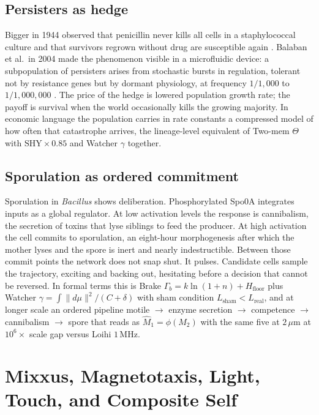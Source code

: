 \documentclass[12pt,a4paper]{article}
\begin{document}
\subsection{Persisters as hedge}

Bigger in 1944 observed that penicillin never kills all cells in a staphylococcal culture and that survivors regrown without drug are susceptible again \cite{bigger1944}. Balaban et al.\ in 2004 made the phenomenon visible in a microfluidic device: a subpopulation of persisters arises from stochastic bursts in regulation, tolerant not by resistance genes but by dormant physiology, at frequency $1/1{,}000$ to $1/1{,}000{,}000$ \cite{balaban2004}. The price of the hedge is lowered population growth rate; the payoff is survival when the world occasionally kills the growing majority. In economic language the population carries in rate constants a compressed model of how often that catastrophe arrives, the lineage-level equivalent of Two-mem $\Theta$ with $\mathrm{SHY} \times 0.85$ and Watcher $\gamma$ together.

\subsection{Sporulation as ordered commitment}

Sporulation in \emph{Bacillus} shows deliberation. Phosphorylated Spo0A integrates inputs as a global regulator. At low activation levels the response is cannibalism, the secretion of toxins that lyse siblings to feed the producer. At high activation the cell commits to sporulation, an eight-hour morphogenesis after which the mother lyses and the spore is inert and nearly indestructible. Between those commit points the network does not snap shut. It pulses. Candidate cells sample the trajectory, exciting and backing out, hesitating before a decision that cannot be reversed. In formal terms this is Brake $\Gamma_b = k\ln(1+n)+H_{\mathrm{floor}}$ plus Watcher $\gamma = \int \lVert d\mu \rVert^2/(C+\delta)$ with sham condition $L_{\mathrm{sham}} < L_{\mathrm{real}}$, and at longer scale an ordered pipeline motile $\to$ enzyme secretion $\to$ competence $\to$ cannibalism $\to$ spore that reads as $\hat{M}_1 = \phi(M_2)$ with the same five at $2\,\mu\mathrm{m}$ at $10^6\times$ scale gap versus Loihi $1$\,MHz.

\section{Mixxus, Magnetotaxis, Light, Touch, and Composite Self}
\label{sec:mixxus}
\end{document}
